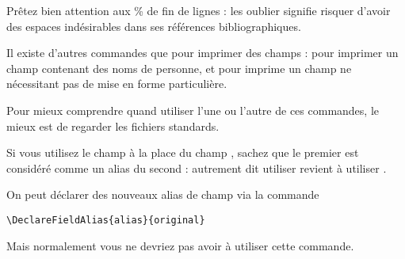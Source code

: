 

Prêtez bien attention aux \% de fin de lignes : les oublier signifie risquer d'avoir des espaces indésirables dans ses références bibliographiques.


\begin{anedocte}

Il  existe d'autres commandes que  pour imprimer des champs :  pour imprimer un champ contenant des noms de personne, et  pour imprime un champ ne nécessitant pas de mise en forme particulière.

Pour mieux comprendre quand utiliser l'une ou l'autre de ces commandes, le mieux est de regarder les fichiers standards.

\end{anedocte}
\begin{anedocte}
Si vous utilisez le champ  à la place du champ , sachez que le premier est considéré comme un alias du second : autrement dit utiliser  revient à utiliser .

On peut déclarer des nouveaux alias de champ via la commande 

\begin{verbatim}
\DeclareFieldAlias{alias}{original}
\end{verbatim}

Mais normalement vous ne devriez pas avoir à utiliser cette commande.
\end{anedocte}
